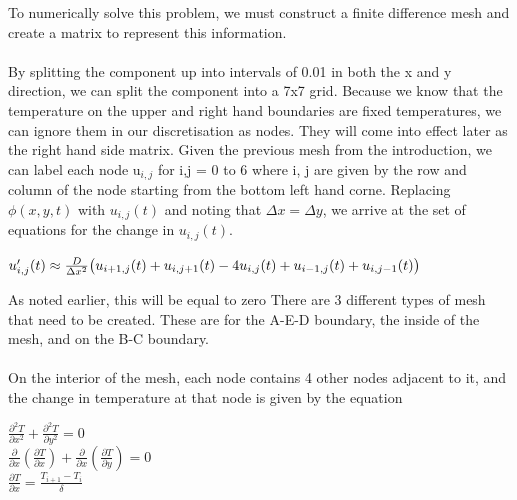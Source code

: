 \documentclass[12pt,a4paper]{article}
\begin{document}
To numerically solve this problem, we must construct a finite difference mesh and create a matrix to represent this information.\\\\
By splitting the component up into intervals of 0.01 in both the x and y direction, we can split the component into a 7x7 grid. Because we know that the temperature on the upper and right hand boundaries are fixed temperatures, we can ignore them in our discretisation as nodes. They will come into effect later as the right hand side matrix. Given the previous mesh from the introduction, we can label each node u$_{i,j}$ for i,j = 0 to 6 where i, j are given by the row and column of the node starting from the bottom left hand corne. Replacing $\phi(x,y,t)$ with $u_{i,j}(t)$ and noting that $\Delta x = \Delta y$, we arrive at the set of equations for the change in $u_{i,j}(t)$.
\begin{center}
$u'_{i,j}(t)\approx\frac{D}{\Delta x^2}\big{(}u_{i+1,j}(t)+u_{i,j+1}(t)-4u_{i,j}(t)+u_{i-1,j}(t)+u_{i,j-1}(t)\big{)}$
\end{center}
As noted earlier, this will be equal to zero 
There are 3 different types of mesh that need to be created. These are for the A-E-D boundary, the inside of the mesh, and on the B-C boundary.\\\\On the interior of the mesh, each node contains 4 other nodes adjacent to it, and the change in temperature at that node is given by the equation
\begin{center}
$\frac{\partial^2 T}{\partial x^2}+\frac{\partial^2 T}{\partial y^2}=0$
\\
$\frac{\partial}{\partial x}(\frac{\partial T}{\partial x}) + \frac{\partial}{\partial x}(\frac{\partial T}{\partial y}) = 0$
\\
$\frac{\partial T}{\partial x}=\frac{T_{i+1}-T_i}{\delta}$ 
\end{center}
\begin{center}
\end{center}
\end{document}
